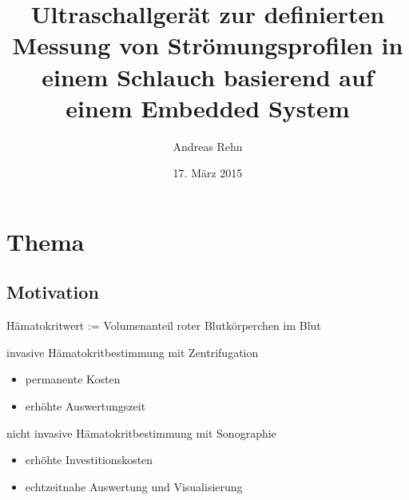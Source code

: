 \documentclass{beamer}
\newcommand{\fullname}{Andreas Rehn}
\newcommand{\titel}{Ultraschallgerät zur definierten Messung von Strömungsprofilen in einem Schlauch basierend auf einem Embedded System}
\begin{document}
\title{\titel}
\author[A. Rehn]{\fullname}
\date[17.03.15]{17. März 2015}

\frame{\titlepage}

\expandafter\def\expandafter\insertshorttitle\expandafter{%
  \insertshorttitle\hfill\insertframenumber}%
  

\section{Thema}

\subsection{Motivation}
\begin{frame}
Hämatokritwert := Volumenanteil roter Blutkörperchen im Blut
\begin{block}{invasive Hämatokritbestimmung mit Zentrifugation}
	\begin{itemize}
		\item permanente Kosten
		\item erhöhte Auswertungszeit
	\end{itemize}
\end{block}
\begin{block}{nicht invasive Hämatokritbestimmung mit Sonographie}
	\begin{itemize}
		\item erhöhte Investitionskosten
		\item echtzeitnahe Auswertung und Visualisierung
	\end{itemize}
\end{block}

\end{frame}
\end{document}
